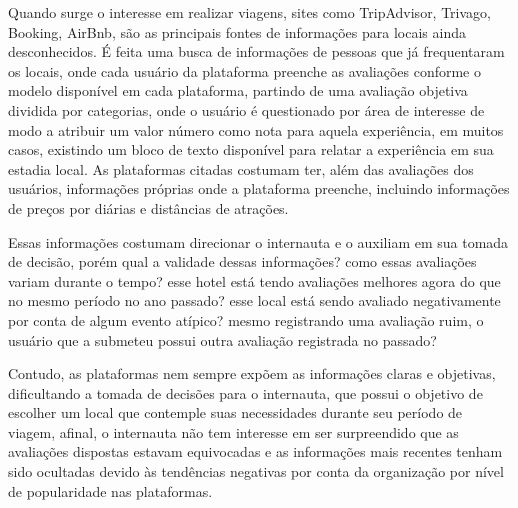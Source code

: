 Quando surge o interesse em realizar viagens, sites como TripAdvisor, Trivago, Booking, AirBnb, são as principais fontes de informações para locais ainda desconhecidos. É feita uma busca de informações de pessoas que já frequentaram os locais, onde cada usuário da plataforma preenche as avaliações conforme o modelo disponível em cada plataforma, partindo de uma avaliação objetiva dividida por categorias, onde o usuário é questionado por área de interesse de modo a atribuir um valor número como nota para aquela experiência, em muitos casos, existindo um bloco de texto disponível para relatar a experiência em sua estadia local. As plataformas citadas costumam ter, além das avaliações dos usuários, informações próprias onde a plataforma preenche, incluindo informações de preços por diárias e distâncias de atrações.

Essas informações costumam direcionar o internauta e o auxiliam em sua tomada de decisão, porém qual a validade dessas informações? como essas avaliações variam durante o tempo? esse hotel está tendo avaliações melhores agora do que no mesmo período no ano passado? esse local está sendo avaliado negativamente por conta de algum evento atípico? mesmo registrando uma avaliação ruim, o usuário que a submeteu possui outra avaliação registrada no passado?

Contudo, as plataformas nem sempre expõem as informações claras e objetivas, dificultando a tomada de decisões para o internauta, que possui o objetivo de escolher um local que contemple suas necessidades durante seu período de viagem, afinal, o internauta não tem interesse em ser surpreendido que as avaliações dispostas estavam equivocadas e as informações mais recentes tenham sido ocultadas devido às tendências negativas por conta da organização por nível de popularidade nas plataformas.

\begin{comment}
O presente relatório está estruturado da seguinte forma: o capítulo~\ref{cap:justificativa} apresenta..., o capítulo~\ref{cap:fund_teorica} ... O capítulo~\ref{cap:metodologia} ..., o capítulo~\ref{cap:resultados} ... O capítulo~\ref{cap:conclusao} 

Demonstração de citação: o software de análise foi desenvolvido na linguagem Python~\cite{van1995python}, usando as bibliotecas Pandas~\cite{mckinney2010data} e Scikit-learn~\cite{scikit-learn}.
\end{comment}

\begin{comment}
    como o sentimento dos usuários que avaliaram o estabelecimento variou durante o tempo, se o recinto está recebendo avaliações com sentimentos mais positivos ou se a tendência é de que as avaliações continuem com sentimentos cada vez mais negativos, e identificar possíveis mudanças de comportamento, que para esses cenários podem ser justificados por mudanças de equipe, mudanças de políticas internas da empresa ou por uma simples manutenção ou evolução das instalações
    , a fim de observar e entender as variações de sentimentos das avaliações realizadas pelos usuários da plataforma distribuídos durante o tempo.
\end{comment}


